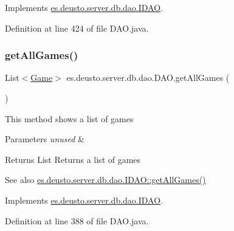 Implements \hyperlink{interfacees_1_1deusto_1_1server_1_1db_1_1dao_1_1_i_d_a_o_ad83c37658f356cb69c1fa70f99416579}{es.\+deusto.\+server.\+db.\+dao.\+I\+D\+AO}.



Definition at line 424 of file D\+A\+O.\+java.

\mbox{\label{classes_1_1deusto_1_1server_1_1db_1_1dao_1_1_d_a_o_af49ed57bdac4dec48ab7616602d12df2}} 
\subsubsection{\texorpdfstring{get\+All\+Games()}{getAllGames()}}
{\footnotesize\ttfamily List$<$\hyperlink{classes_1_1deusto_1_1server_1_1db_1_1data_1_1_game}{Game}$>$ es.\+deusto.\+server.\+db.\+dao.\+D\+A\+O.\+get\+All\+Games (\begin{DoxyParamCaption}{ }\end{DoxyParamCaption})}

This method shows a list of games 
\begin{DoxyParams}{Parameters}
{\em unused} & \\
\hline
\end{DoxyParams}
\begin{DoxyReturn}{Returns}
List Returns a list of games 
\end{DoxyReturn}
\begin{DoxySeeAlso}{See also}
\hyperlink{interfacees_1_1deusto_1_1server_1_1db_1_1dao_1_1_i_d_a_o_aebafef372cf3064b12d16fcb651b41ff}{es.\+deusto.\+server.\+db.\+dao.\+I\+D\+A\+O\+::get\+All\+Games()} 
\end{DoxySeeAlso}


Implements \hyperlink{interfacees_1_1deusto_1_1server_1_1db_1_1dao_1_1_i_d_a_o_aebafef372cf3064b12d16fcb651b41ff}{es.\+deusto.\+server.\+db.\+dao.\+I\+D\+AO}.



Definition at line 388 of file D\+A\+O.\+java.

\mbox{\label{classes_1_1deusto_1_1server_1_1db_1_1dao_1_1_d_a_o_ac1cb7032ef21f53dead8347ef440f431}} 
